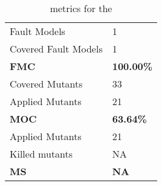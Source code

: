 
\begin{table}[H]

\begin{tabular}{|l|l|}
\hline
Fault Models & 1 \\
Covered Fault Models & 1 \\
\hline
\textbf{FMC} & \textbf{100.00\%} \\
\hline
Covered Mutants & 33 \\
Applied Mutants & 21 \\
\hline
\textbf{MOC} & \textbf{63.64\%} \\
\hline
Applied Mutants & 21 \\
Killed mutants & NA \\
\hline
\textbf{MS} & \textbf{NA} \\
\hline
\end{tabular}
\caption{\DAMA metrics for the \case}
\label{tab:metrics}
\end{table}
